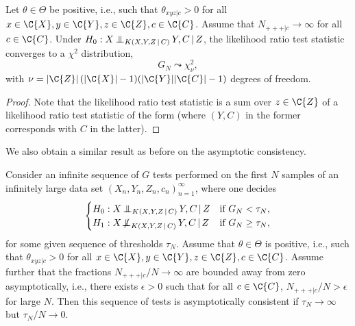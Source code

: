 \begin{Prp}\label{prp:general_G_test_asymptotics_H0}
  Let $\theta \in \Theta$ be positive, i.e., such that $\theta_{xyz|c} > 0$ for all $x \in \C{X}, y \in \C{Y}, z \in \C{Z}, c \in \C{C}$.
  Assume that $N_{+++|c} \to \infty$ for all $c \in \C{C}$.
  Under $H_0 : X \operatorname*{\perp\mkern-11mu\perp}_{K(X,Y,Z \operatorname*{|} C)} Y,C \operatorname*{|} Z$, the likelihood ratio test statistic  converges
  to a $\chi^2$ distribution,
  $$G_N \leadsto \chi^2_\nu,$$
  with $\nu = |\C{Z}|\,(|\C{X}| - 1)(|\C{Y}||\C{C}| - 1)$ degrees of freedom.
\end{Prp}
\begin{proof}
  Note that the likelihood ratio test statistic  is a sum
  over $z \in \C{Z}$ of a likelihood ratio test statistic of the form 
   (where $(Y,C)$ in the former corresponds with $C$ in the latter). 
\end{proof}
We also obtain a similar result as before on the asymptotic consistency.
\begin{Cor}\label{cor:gen_G_test_consistency}
Consider an infinite sequence of $G$ tests performed on the first $N$ samples of an infinitely large
data set $(X_n,Y_n,Z_n,c_n)_{n=1}^\infty$,
where one decides
  $$\begin{cases}
    H_0 : X \operatorname*{\perp\mkern-11mu\perp}_{K(X,Y,Z \operatorname*{|} C)} Y,C \operatorname*{|} Z     & \text{if $G_N < \tau_N$},\\
    H_1 : X \operatorname*{\not\mkern-2mu\perp\mkern-11mu\perp}_{K(X,Y,Z \operatorname*{|} C)} Y,C \operatorname*{|} Z & \text{if $G_N \ge \tau_N$,}
  \end{cases}$$
for some given sequence of thresholds $\tau_N$.
Assume that $\theta \in \Theta$ is positive, i.e., such that $\theta_{xyz|c} > 0$ for all $x \in \C{X}, y \in \C{Y}, z \in \C{Z}, c \in \C{C}$.
Assume further that the fractions $N_{+++|c} / N \to \infty$ are bounded away from zero asymptotically,
i.e., there exists $\epsilon > 0$ such that for all $c \in \C{C}$, $N_{+++|c} / N > \epsilon$ for large $N$.
Then this sequence of tests is asymptotically consistent if $\tau_N \to \infty$ but $\tau_N / N \to 0$.
\end{Cor}


